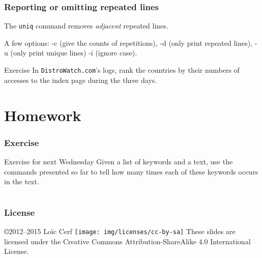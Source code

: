 \documentclass{beamer}
\begin{document}
\begin{frame}
  \frametitle{Reporting or omitting repeated lines}
  The \texttt{uniq} command removes \emph{adjacent} repeated lines.

  \vfill

  A few options: -c (give the counts of repetitions), -d (only print
  repeated lines), -u (only print unique lines) -i (ignore case).

  \vfill
  \pause

  \begin{exampleblock}{Exercise}
    In \texttt{DistroWatch.com}'s logs, rank the countries by their
    numbers of accesses to the index page during the three days.
  \end{exampleblock}
\end{frame}

\section*{Homework}

\begin{frame}
  \frametitle{Exercise}
  \begin{alertblock}{Exercise for next Wednesday}
    Given a list of keywords and a text, use the commands presented so
    far to tell how many times each of these keywords occurs in the
    text.
  \end{alertblock}
\end{frame}

\section*{}

\begin{frame}
  \frametitle{License}
  \begin{block}{\copyright 2012--2015 Loïc Cerf}
    \texttt{[image: img/licenses/cc-by-sa]}\hskip1pt
    These slides are licensed under the Creative Commons
    Attribution-ShareAlike 4.0 International License.
  \end{block} 
\end{frame}
\end{document}
